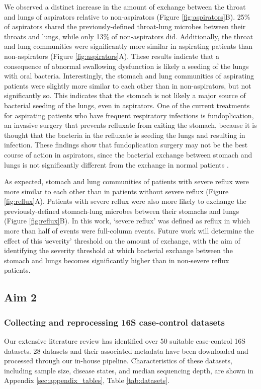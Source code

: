 \documentclass[12pt]{article}
\begin{document}
We observed a distinct increase in the amount of exchange between the 
throat and lungs of aspirators relative to non-aspirators (Figure \ref{fig:aspirators}B).
25\% of aspirators shared
the previously-defined throat-lung microbes between their throats and lungs, while only 13\% of 
non-aspirators did. Additionally, the throat and lung communities
were significantly more similar in aspirating patients than non-aspirators (Figure \ref{fig:aspirators}A). These results indicate that a consequence of abnormal swallowing
dysfunction is likely a seeding of the lungs with oral bacteria.
Interestingly, the stomach and lung communities of aspirating
patients were slightly more similar to each other than in non-aspirators, but not significantly so.
This indicates that the stomach is not likely a major source
of bacterial seeding of the lungs, even in aspirators. One of the current treatments for
aspirating patients who have frequent respiratory infections is fundoplication,
an invasive surgery that prevents refluxate from exiting the stomach, because it is thought
that the bacteria in the refluxate is seeding the lungs
and resulting in infection.
These findings show that fundoplication surgery may not be the best course of action in aspirators, since 
the bacterial exchange between stomach and lungs is not
significantly different from the exchange in normal patients \cite{debenedictis-asp_dis-2009, kawahara-fundo-2004}.

As expected, stomach and lung communities of patients with severe reflux were
more similar to each other than in patients without
severe reflux (Figure \ref{fig:reflux}A). 
Patients with severe reflux were also more likely
to exchange the previously-defined stomach-lung microbes between their stomachs and lungs (Figure \ref{fig:reflux}B).
In this work, `severe reflux' was defined as reflux in 
which more than half of events were full-column events.
Future work will determine the effect of this `severity' 
threshold on the amount of exchange, with the aim
of identifying the severity threshold at which bacterial exchange
between the stomach and lungs becomes significantly higher than in non-severe reflux patients.


\subsection{Aim 2}
\subsubsection{Collecting and reprocessing 16S case-control datasets}
Our extensive literature review has identified over 50 suitable case-control 16S datasets.
28 datasets and their associated metadata have been downloaded and processed through our in-house pipeline.
Characteristics of these datasets, including sample size, disease states,
and median sequencing depth, are shown in Appendix \ref{sec:appendix_tables}, Table \ref{tab:datasets}.
\end{document}

